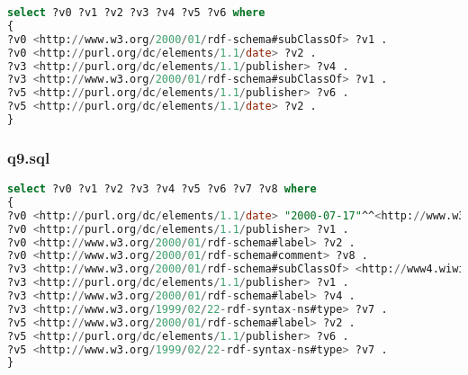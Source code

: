 \documentclass[titlepage, a4paper, 12pt] {article}
\begin{document}
\begin{lstlisting}[language=SQL] 
select ?v0 ?v1 ?v2 ?v3 ?v4 ?v5 ?v6 where
{
?v0 <http://www.w3.org/2000/01/rdf-schema#subClassOf> ?v1 .
?v0 <http://purl.org/dc/elements/1.1/date> ?v2 .
?v3 <http://purl.org/dc/elements/1.1/publisher> ?v4 .
?v3 <http://www.w3.org/2000/01/rdf-schema#subClassOf> ?v1 .
?v5 <http://purl.org/dc/elements/1.1/publisher> ?v6 .
?v5 <http://purl.org/dc/elements/1.1/date> ?v2 .
}
\end{lstlisting}

\subsubsection{q9.sql}

\begin{lstlisting}[language=SQL] 
select ?v0 ?v1 ?v2 ?v3 ?v4 ?v5 ?v6 ?v7 ?v8 where
{
?v0 <http://purl.org/dc/elements/1.1/date> "2000-07-17"^^<http://www.w3.org/2001/XMLSchema#date> .
?v0 <http://purl.org/dc/elements/1.1/publisher> ?v1 .
?v0 <http://www.w3.org/2000/01/rdf-schema#label> ?v2 .
?v0 <http://www.w3.org/2000/01/rdf-schema#comment> ?v8 .
?v3 <http://www.w3.org/2000/01/rdf-schema#subClassOf> <http://www4.wiwiss.fu-berlin.de/bizer/bsbm/v01/instances/ProductType2> .
?v3 <http://purl.org/dc/elements/1.1/publisher> ?v1 .
?v3 <http://www.w3.org/2000/01/rdf-schema#label> ?v4 .
?v3 <http://www.w3.org/1999/02/22-rdf-syntax-ns#type> ?v7 .
?v5 <http://www.w3.org/2000/01/rdf-schema#label> ?v2 .
?v5 <http://purl.org/dc/elements/1.1/publisher> ?v6 .
?v5 <http://www.w3.org/1999/02/22-rdf-syntax-ns#type> ?v7 .
}
\end{lstlisting}

\clearpage



\end{document}
